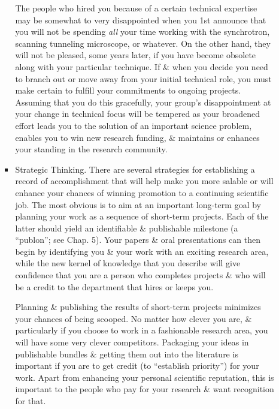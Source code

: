 \documentclass{article}
\begin{document}
\begin{enumerate}
\begin{itemize}
\begin{itemize}
			The people who hired you because of a certain technical expertise may be somewhat to very disappointed when you 1st announce that you will not be spending {\it all} your time working with the synchrotron, scanning tunneling microscope, or whatever. On the other hand, they will not be pleased, some years later, if you have become obsolete along with your particular technique. If \& when you decide you need to branch out or move away from your initial technical role, you must make certain to fulfill your commitments to ongoing projects. Assuming that you do this gracefully, your group's disappointment at your change in technical focus will be tempered as your broadened effort leads you to the solution of an important science problem, enables you to win new research funding, \& maintains or enhances your standing in the research community.
			\item {\sf Strategic Thinking.} There are several strategies for establishing a record of accomplishment that will help make you more salable or will enhance your chances of winning promotion to a continuing scientific job. The most obvious is to aim at an important long-term goal by planning your work as a sequence of short-term projects. Each of the latter should yield an identifiable \& publishable milestone (a ``publon''; see Chap. 5). Your papers \& oral presentations can then begin by identifying you \& your work with an exciting research area, while the new kernel of knowledge that you describe will give confidence that you are a person who completes projects \& who will be a credit to the department that hires or keeps you.
			
			Planning \& publishing the results of short-term projects minimizes your chances of being scooped. No matter how clever you are, \& particularly if you choose to work in a fashionable research area, you will have some very clever competitors. Packaging your ideas in publishable bundles \& getting them out into the literature is important if you are to get credit (to ``establish priority'') for your work. Apart from enhancing your personal scientific reputation, this is important to the people who pay for your research \& want recognition for that.
			

\end{itemize}
\end{itemize}
\end{enumerate}
\end{document}
